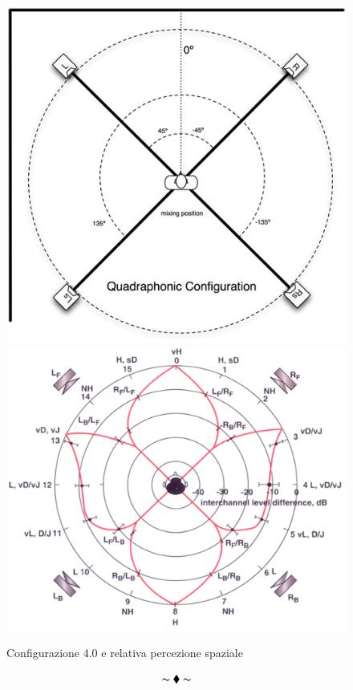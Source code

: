 \documentclass[12pt,a4paper]{report}
\begin{document}
\begin{figure}[htbp]
	\centering
	\includegraphics[scale=0.40]{figures/quad.jpg} \includegraphics[scale=0.45]{figures/farfalla.png}
	\caption {Configurazione 4.0 e relativa percezione spaziale}
	\label{fig:quadrifonia}
	\end{figure}

\[\thicksim\blacklozenge \thicksim \]
\end{document}
